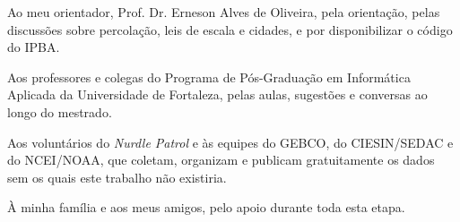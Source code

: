 Ao meu orientador, Prof. Dr. Erneson Alves de Oliveira, pela orientação, pelas discussões sobre percolação, leis de escala e cidades, e por disponibilizar o código do IPBA.

Aos professores e colegas do Programa de Pós-Graduação em Informática Aplicada da Universidade de Fortaleza, pelas aulas, sugestões e conversas ao longo do mestrado.

Aos voluntários do \textit{Nurdle Patrol} e às equipes do GEBCO, do CIESIN/SEDAC e do NCEI/NOAA, que coletam, organizam e publicam gratuitamente os dados sem os quais este trabalho não existiria.

À minha família e aos meus amigos, pelo apoio durante toda esta etapa.
